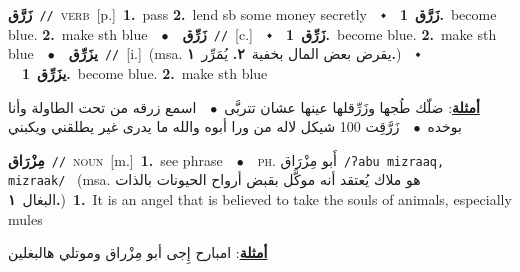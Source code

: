 \documentclass[10pt,a4paper,twoside]{article} %
\begin{document}
\begin{multicols}{2}
{\setlength\topsep{0pt}\textbf{\foreignlanguage{arabic}{زَرَّق}}\ {\color{gray}\texttt{//}\color{black}}\ \textsc{verb}\ [p.]\ \textbf{1.}~pass  \textbf{2.}~lend sb some money secretly\ \ $\smblkdiamond$\ \ \setlength\topsep{0pt}\textbf{\foreignlanguage{arabic}{زَرَّق}}\ \textbf{1.}~become blue.  \textbf{2.}~make sth blue\ \ $\bullet$\ \ \setlength\topsep{0pt}\textbf{\foreignlanguage{arabic}{زَرِّق}}\ {\color{gray}\texttt{//}\color{black}}\ [c.]\ \ $\smblkdiamond$\ \ \setlength\topsep{0pt}\textbf{\foreignlanguage{arabic}{زَرِّق}}\ \textbf{1.}~become blue.  \textbf{2.}~make sth blue\ \ $\bullet$\ \ \setlength\topsep{0pt}\textbf{\foreignlanguage{arabic}{يزَرِّق}}\ {\color{gray}\texttt{//}\color{black}}\ [i.]\ \color{gray}(msa. \foreignlanguage{arabic}{يقرض بعض المال بخفية}~\foreignlanguage{arabic}{\textbf{٢.}}  \foreignlanguage{arabic}{يُمَرِّر}~\foreignlanguage{arabic}{\textbf{١.}})\color{black}\ \ $\smblkdiamond$\ \ \setlength\topsep{0pt}\textbf{\foreignlanguage{arabic}{يزَرِّق}}\ \textbf{1.}~become blue.  \textbf{2.}~make sth blue\  \begin{flushright}\color{gray}\foreignlanguage{arabic}{\textbf{\underline{\foreignlanguage{arabic}{أمثلة}}}: ضلّك طُجها وزَرِّقلها عينها عشان تتربَّى\ $\bullet$\ \  اسمع زرقه من تحت الطاولة وأنا بوخده\ $\bullet$\ \  زَرَّقِت 100 شيكل لاله من ورا أبوه والله ما يدرى غير يطلقني ويكبني}\end{flushright}\color{black}} \vspace{2mm}

{\setlength\topsep{0pt}\textbf{\foreignlanguage{arabic}{مِزْرَاق}}\ {\color{gray}\texttt{//}\color{black}}\ \textsc{noun}\ [m.]\ \textbf{1.}~see phrase\ \ $\bullet$\ \ \textsc{ph.} \color{gray} \foreignlanguage{arabic}{أَبو مِزْرَاق}\color{black}\ {\color{gray}\texttt{/{\sffamily ʔabu mizraaq, mizraak}/}\color{black}}\ \color{gray} (msa. \foreignlanguage{arabic}{هو ملاك يُعتقد أنه موكَّل بقبض أرواح الحيونات بالذات البغال}~\foreignlanguage{arabic}{\textbf{١.}})\color{black}\ \textbf{1.}~It is an angel that is believed to take the souls of animals, especially mules\  \begin{flushright}\color{gray}\foreignlanguage{arabic}{\textbf{\underline{\foreignlanguage{arabic}{أمثلة}}}: امبارح إِجى أبو مِزْراق وموتلي هالبغلين}\end{flushright}\color{black}} \vspace{2mm}


\end{multicols}
\end{document}
